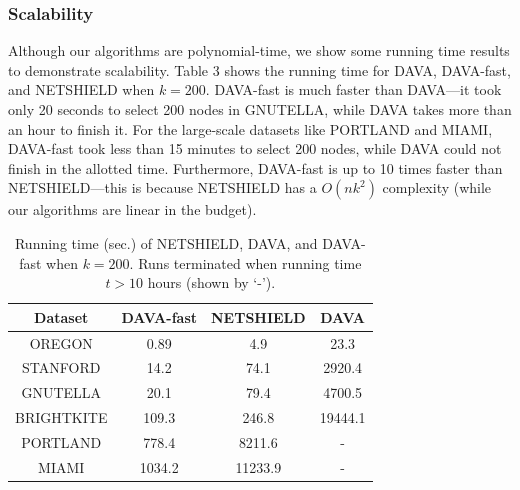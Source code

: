 \documentclass{article}
\begin{document}
\subsubsection{Scalability}

Although our algorithms are polynomial-time, we show some running time results to demonstrate scalability. Table 3 shows the running time for DAVA, DAVA-fast, and NETSHIELD when $k = 200$. DAVA-fast is much faster than DAVA—it took only 20 seconds to select 200 nodes in GNUTELLA, while DAVA takes more than an hour to finish it. For the large-scale datasets like PORTLAND and MIAMI, DAVA-fast took less than 15 minutes to select 200 nodes, while DAVA could not finish in the allotted time. Furthermore, DAVA-fast is up to 10 times faster than NETSHIELD—this is because NETSHIELD has a $O(nk^2)$ complexity (while our algorithms are linear in the budget).

\begin{table}[h!]
    \centering
    \begin{tabular}{|c|c|c|c|}
        \hline
        Dataset & DAVA-fast & NETSHIELD & DAVA \\
        \hline
        OREGON & 0.89 & 4.9 & 23.3 \\
        STANFORD & 14.2 & 74.1 & 2920.4 \\
        GNUTELLA & 20.1 & 79.4 & 4700.5 \\
        BRIGHTKITE & 109.3 & 246.8 & 19444.1 \\
        PORTLAND & 778.4 & 8211.6 & - \\
        MIAMI & 1034.2 & 11233.9 & - \\
        \hline
    \end{tabular}
    \caption{Running time (sec.) of NETSHIELD, DAVA, and DAVA-fast when $k = 200$. Runs terminated when running time $t > 10$ hours (shown by ‘-’).}
\end{table}
\end{document}
